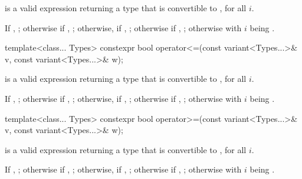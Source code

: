 \begin{itemdescr}
\pnum
\requires
{} is a valid expression returning a type that is
convertible to , for all $i$.

\pnum
\returns
If , ;
otherwise if , ;
otherwise, if , ;
otherwise if , ;
otherwise  with $i$ being .
\end{itemdescr}

%
\begin{itemdecl}
template<class... Types>
  constexpr bool operator<=(const variant<Types...>& v, const variant<Types...>& w);
\end{itemdecl}

\begin{itemdescr}
\pnum
\requires
{} is a valid expression returning a type that is
convertible to , for all $i$.

\pnum
\returns
If , ;
otherwise if , ;
otherwise, if , ;
otherwise if , ;
otherwise  with $i$ being .
\end{itemdescr}

%
\begin{itemdecl}
template<class... Types>
  constexpr bool operator>=(const variant<Types...>& v, const variant<Types...>& w);
\end{itemdecl}

\begin{itemdescr}
\pnum
\requires
{} is a valid expression returning a type that is
convertible to , for all $i$.

\pnum
\returns
If , ;
otherwise if , ;
otherwise, if , ;
otherwise if , ;
otherwise  with $i$ being .
\end{itemdescr}


